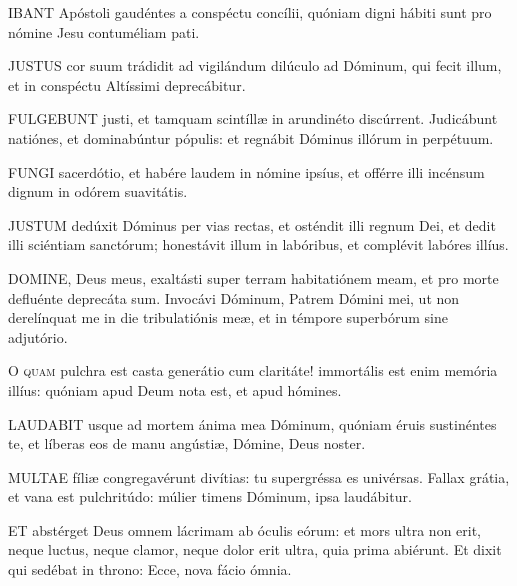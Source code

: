 \lettrine[lines=2]{I}{BANT} Apóstoli gaudéntes a conspéctu concílii, quóniam digni hábiti sunt pro nómine Jesu contuméliam pati.


\lettrine[lines=2]{J}{USTUS} cor suum trádidit ad vigilándum dilúculo ad Dóminum, qui fecit illum, et in conspéctu Altíssimi deprecábitur.


\lettrine[lines=2]{F}{ULGEBUNT} justi, et tamquam scintíllæ in arundinéto discúrrent. Judicábunt natiónes, et dominabúntur pópulis: et regnábit Dóminus illórum in perpétuum.


\lettrine[lines=2]{F}{UNGI} sacerdótio, et habére laudem in nómine ipsíus, et offérre illi incénsum dignum in odórem suavitátis.


\lettrine[lines=2]{J}{USTUM} dedúxit Dóminus per vias rectas, et osténdit illi regnum Dei, et dedit illi sciéntiam sanctórum; honestávit illum in labóribus, et complévit labóres illíus.


\lettrine[lines=2]{D}{OMINE}, Deus meus, exaltásti super terram habitatiónem meam, et pro morte defluénte deprecáta sum. Invocávi Dóminum, Patrem Dómini mei, ut non derelínquat me in die tribulatiónis meæ, et in témpore superbórum sine adjutório.


\lettrine[lines=2]{O}{} \textsc{quam} pulchra est casta generátio cum claritáte! immortális est enim memória illíus: quóniam apud Deum nota est, et apud hómines.


\lettrine[lines=2]{L}{AUDABIT} usque ad mortem ánima mea Dóminum, quóniam éruis sustinéntes te, et líberas eos de manu angústiæ, Dómine, Deus noster.


\lettrine[lines=2]{M}{ULTAE} fíliæ congregavérunt divítias: tu supergréssa es univérsas. Fallax grátia, et vana est pulchritúdo: múlier timens Dóminum, ipsa laudábitur.


\lettrine[lines=2]{E}{T} abstérget Deus omnem lácrimam ab óculis eórum: et mors ultra non erit, neque luctus, neque clamor, neque dolor erit ultra, quia prima abiérunt. Et dixit qui sedébat in throno: Ecce, nova fácio ómnia.

